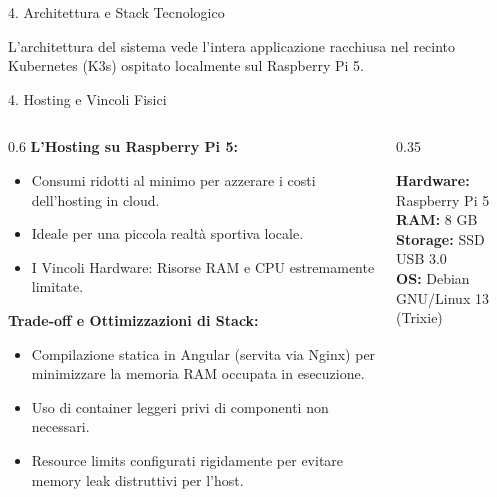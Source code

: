\documentclass[aspectratio=169, 10pt]{beamer}
\begin{document}
\begin{frame}{4. Architettura e Stack Tecnologico}
\begin{center}
  \end{center}
  \vspace{0.1cm}
  \centering
  \scriptsize{L'architettura del sistema vede l'intera applicazione racchiusa nel recinto Kubernetes (K3s) ospitato localmente sul Raspberry Pi 5.}
\end{frame}

\begin{frame}{4. Hosting e Vincoli Fisici}
  \begin{columns}
    \begin{column}{0.6\textwidth}
      \textbf{L'Hosting su Raspberry Pi 5:}
      \begin{itemize}
        \item Consumi ridotti al minimo per azzerare i costi dell'hosting in cloud.
        \item Ideale per una piccola realtà sportiva locale.
        \item \alert{I Vincoli Hardware:} Risorse RAM e CPU estremamente limitate.
      \end{itemize}
      \vspace{0.3cm}
      \textbf{Trade-off e Ottimizzazioni di Stack:}
      \begin{itemize}
        \item Compilazione statica in Angular (servita via Nginx) per minimizzare la memoria RAM occupata in esecuzione.
        \item Uso di container leggeri privi di componenti non necessari.
        \item Resource limits configurati rigidamente per evitare memory leak distruttivi per l'host.
      \end{itemize}
    \end{column}
    \begin{column}{0.35\textwidth}
      \begin{tcolorbox}[colback=karateDark!5, colframe=karateDark, title=Specifiche Host]
        \textbf{Hardware:} Raspberry Pi 5\\
        \textbf{RAM:} 8 GB\\
        \textbf{Storage:} SSD USB 3.0\\
        \textbf{OS:} Debian GNU/Linux 13 (Trixie)\\
      \end{tcolorbox}
    \end{column}
  \end{columns}
\end{frame}
\end{document}

